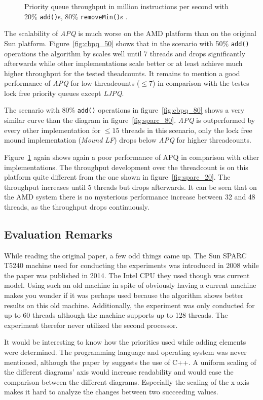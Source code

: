 \begin{figure}[htb]
\begin{minipage}[b]{.495\textwidth}
		\caption{Priority queue throughput in million instructions per second with 20\% \texttt{add()}s, 80\% \texttt{removeMin()}s \cite{braginsky_cbpq:_2016}.}
		\label{fig:cbpq_20}
	\end{minipage}
\end{figure}

The scalability of \textit{APQ} is much worse on the AMD platform than on the original Sun platform. Figure~\ref{fig:cbpq_50} shows that in the scenario with 50\% \texttt{add()} operations the algorithm by \citeauthor{calciu_adaptive_2014} scales well until 7 threads and drops significantly afterwards while other implementations scale better or at least achieve much higher throughput for the tested theadcounts. It remains to mention a good performance of \textit{APQ} for low threadcounts ($\le 7$) in comparison with the testes lock free priority queues except \textit{LJPQ}.

The scenario with 80\% \texttt{add()} operations in figure~\ref{fig:cbpq_80} shows a very similar curve than the diagram in figure~\ref{fig:sparc_80}. \textit{APQ} is outperformed by every other implementation for $\le 15$ threads in this scenario, only the lock free mound implementation (\textit{Mound LF}) drops below \textit{APQ} for higher threadcounts.

Figure~\ref{fig:cbpq_20} again shows again a poor performance of APQ in comparison with other implementations. The throughput development over the threadcount is on this platform quite different from the one shown in figure~\ref{fig:sparc_20}. The throughput increases until 5 threads but drops afterwards. It can be seen that on the AMD system there is no mysterious performance increase between 32 and 48 threads, as the throughput drops continuously. 

\subsection{Evaluation Remarks}

While reading the original paper, a few odd things came up. The Sun SPARC T5240 machine used for conducting the experiments was introduced in 2008 while the paper was published in 2014. The Intel CPU they used though was current model. Using such an old machine in spite of obviously having a current machine makes you wonder if it was perhaps used because the algorithm shows better results on this old machine. Additionally, the experiment was only conducted for up to 60 threads although the machine supports up to 128 threads. The experiment therefor never utilized the second processor.

It would be interesting to know how the priorities used while adding elements were determined. The programming language and operating system was never mentioned, although the paper by \citeauthor{braginsky_cbpq:_2016} suggests the use of C++. A uniform scaling of the different diagrams' axis would increase readability and would ease the comparison between the different diagrams. Especially the scaling of the x-axis makes it hard to analyze the changes between two succeeding values.






